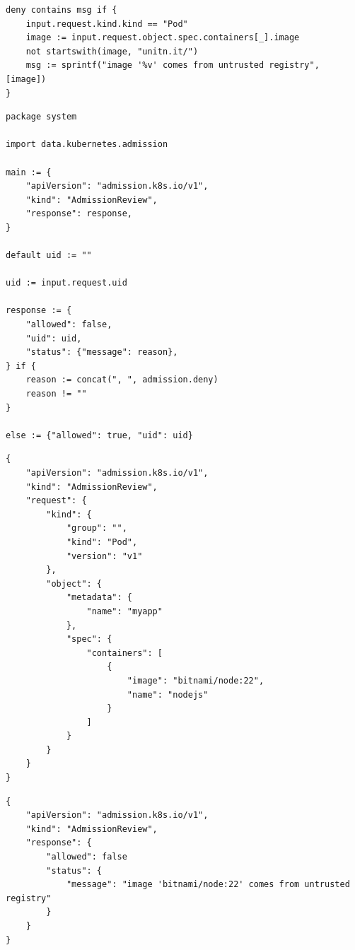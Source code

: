 \begin{lstlisting}[language=Rego, caption={Rego policy for Pods registry},
label=lst:rego_data_mapping]                              
deny contains msg if {                                                      
    input.request.kind.kind == "Pod"                                        
    image := input.request.object.spec.containers[_].image                  
    not startswith(image, "unitn.it/")                                     
    msg := sprintf("image '%v' comes from untrusted registry", [image])     
}
\end{lstlisting}

\begin{lstlisting}[language=Rego, caption={Rego ``root" policy (system.main)}]
package system

import data.kubernetes.admission

main := {
	"apiVersion": "admission.k8s.io/v1",
	"kind": "AdmissionReview",
	"response": response,
}

default uid := ""

uid := input.request.uid

response := {
	"allowed": false,
	"uid": uid,
	"status": {"message": reason},
} if {
	reason := concat(", ", admission.deny)
	reason != ""
}

else := {"allowed": true, "uid": uid}
\end{lstlisting}


\newpage
\lstset{style=jsonstyle}
\begin{lstlisting}[caption={AdmissionReview request}]
{
    "apiVersion": "admission.k8s.io/v1",
    "kind": "AdmissionReview",
    "request": {
        "kind": {
            "group": "",
            "kind": "Pod",
            "version": "v1"
        },
        "object": {
            "metadata": {
                "name": "myapp"
            },
            "spec": {
                "containers": [
                    {
                        "image": "bitnami/node:22",
                        "name": "nodejs"
                    }
                ]
            }
        }
    }
}
\end{lstlisting}

\lstset{style=jsonstyle}
\begin{lstlisting}[caption={AdmissionReview response}]
{
    "apiVersion": "admission.k8s.io/v1",
    "kind": "AdmissionReview",
    "response": {
        "allowed": false
        "status": {
            "message": "image 'bitnami/node:22' comes from untrusted registry"
        }
    }
}
\end{lstlisting}

